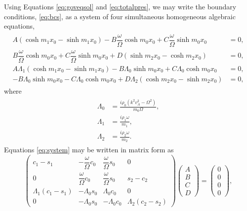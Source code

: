 Using Equations \eqref{eq:goveqsol} and \eqref{eq:totalpres}, we may write the boundary conditions, \eqref{eq:bcs}, as a system of four simultaneous homogeneous algebraic equations,
%
\begin{align}
\begin{split}
\label{eq:system}
A (\cosh m_1 x_0 - \sinh m_1 x_0)
- B \dfrac{\omega}{\Omega} \cosh m_0 x_0
+ C \dfrac{\omega}{\Omega} \sinh m_0 x_0 & = 0,
\\[0.3cm]
B \dfrac{\omega}{\Omega} \cosh m_0 x_0
+ C \dfrac{\omega}{\Omega} \sinh m_0 x_0
+ D(\sinh m_2 x_0 - \cosh m_2 x_0) & = 0,
\\[0.3cm]
A \Lambda_1 (\cosh m_1 x_0 - \sinh m_1 x_0)
- B \Lambda_0 \sinh m_0 x_0
+ C \Lambda_0 \cosh m_0 x_0 & = 0,
\\[0.3cm]
- B \Lambda_0 \sinh m_0 x_0
- C \Lambda_0 \cosh m_0 x_0
+ D \Lambda_2 (\cosh m_2 x_0 - \sinh m_2 x_0) & = 0,
\end{split}
\end{align}
%
where
%
\begin{align}
\begin{split}
\label{eq:lambdas}
\Lambda_0 
& = \frac{i \rho_0 \left( k^2 v_A^2 - \Omega^2 \right)}{m_0 \Omega},
\\[0.3cm]
\Lambda_1 
& = \frac{i \rho_1 \omega}{m_1},
\\[0.3cm]
\Lambda_2 
& = \frac{i \rho_2 \omega}{m_2}.
\end{split}
\end{align}
%
Equations \eqref{eq:system} may be written in matrix form as
%
\begin{equation}
\label{eq:matrix1}
\begin{pmatrix}
c_1 - s_1 
& - \dfrac{\omega}{\Omega} c_0
& \dfrac{\omega}{\Omega} s_0
& 0
\\[0.3cm]
0
& \dfrac{\omega}{\Omega} c_0
& \dfrac{\omega}{\Omega} s_0
& s_2 - c_2
\\[0.3cm]
\Lambda_1 (c_1 - s_1)
& - \Lambda_0 s_0
& \Lambda_0 c_0
& 0
\\[0.3cm]
0
& - \Lambda_0 s_0
& - \Lambda_0 c_0
& \Lambda_2 (c_2 - s_2)
\end{pmatrix}
\begin{pmatrix}
A
\\[0.3cm]
B
\\[0.3cm]
C
\\[0.3cm]
D
\end{pmatrix}
=
\begin{pmatrix}
0
\\[0.3cm]
0
\\[0.3cm]
0
\\[0.3cm]
0
\end{pmatrix},
\end{equation}
